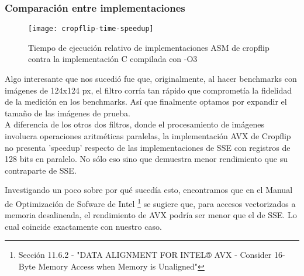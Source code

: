 \subsubsection{Comparación entre implementaciones}

\begin{figure}[h]
\centering
\texttt{[image: cropflip-time-speedup]}
\caption{Tiempo de ejecución relativo de implementaciones ASM de cropflip contra la implementación C compilada con -O3}
\label{fig:cropflip-time-speedup}
\end{figure}

Algo interesante que nos sucedió fue que, originalmente, al hacer benchmarks con imágenes de 124x124 px, el filtro corría tan rápido que comprometía la fidelidad de la medición en los benchmarks. Así que finalmente optamos por expandir el tamaño de las imágenes de prueba.
\\

A diferencia de los otros dos filtros, donde el procesamiento de imágenes involucra operaciones aritméticas paralelas, la implementación AVX de Cropflip no presenta 'speedup' respecto de las implementaciones de SSE con registros de 128 bits en paralelo. No sólo eso sino que demuestra menor rendimiento que su contraparte de SSE.


Investigando un poco sobre por qué sucedía esto, encontramos que en el Manual de Optimización de Sofware de Intel \footnote{Sección 11.6.2 - "DATA ALIGNMENT FOR INTEL® AVX - Consider 16-Byte Memory Access when Memory is Unaligned"} se sugiere que, para accesos vectorizados a memoria desalineada, el rendimiento de AVX podría ser menor que el de SSE. Lo cual coincide exactamente con nuestro caso.

